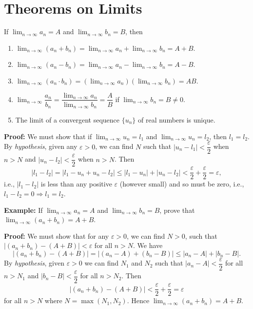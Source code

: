 \documentclass[titlepage,a4paper,12pt]{report}
\begin{document}
\section{Theorems on Limits}
If $\displaystyle \lim _{n\rightarrow \infty} a_n =A$ and $\displaystyle \lim _{n\rightarrow \infty} b_n =B$, then 
\begin{enumerate}
\item $\displaystyle \lim _{n\rightarrow \infty} (a_n +b_n) = \lim _{n\rightarrow \infty} a_n + \lim _{n\rightarrow \infty} b_n =A +B$.
\item $\displaystyle \lim _{n\rightarrow \infty} (a_n-b_n) = \lim _{n\rightarrow \infty} a_n-\displaystyle \lim _{n\rightarrow \infty} b_n =A-B$.
\item $\displaystyle \lim _{n\rightarrow \infty} (a_n\cdot b_n)=(\lim _{n\rightarrow \infty} a_n)(\lim _{n\rightarrow \infty} b_n)=AB$.
\item $\displaystyle \lim _{n\rightarrow \infty} \dfrac{a_n}{b_n}=\dfrac{\displaystyle \lim _{n\rightarrow \infty} a_n}{\displaystyle \lim _{n\rightarrow \infty} b_n} =\dfrac{A}{B}$ if $\displaystyle \lim _{n\rightarrow \infty} b_n =B\neq 0$.
\item The limit of a convergent sequence $\{u_n\}$ of real numbers is unique. 
\end{enumerate}
\noindent \textbf{Proof:} We must show that if $\displaystyle \lim _{n\rightarrow \infty} u_n=l_1$ and $\displaystyle \lim _{n\rightarrow \infty} u_n=l_2$, then $l_1=l_2$. By \textit{hypothesis}, given any $\varepsilon >0$, we can find $N$ such that $|u_n-l_1|<\dfrac{\varepsilon}{2}$ when $n>N$ and $|u_n-l_2|<\dfrac{\varepsilon}{2}$ when $n>N$. Then 
\begin{equation*}
|l_1-l_2|=|l_1-u_n+u_n-l_2| \leq |l_1-u_n|+|u_n-l_2|<\dfrac{\varepsilon}{2}+\dfrac{\varepsilon}{2}=\varepsilon , 
\end{equation*}
i.e., $|l_1-l_2|$ is less than any positive $\varepsilon$ (however small) and so must be zero, i.e., $l_1-l_2=0\Longrightarrow l_1=l_2$.

\noindent \textbf{Example:} If $\displaystyle \lim _{n\rightarrow \infty} a_n=A$ and $\displaystyle \lim _{n\rightarrow \infty} b_n=B$, prove that $\displaystyle \lim _{n\rightarrow \infty} (a_n +b_n )=A+B$.

\noindent \textbf{Proof:} We must show that for any $\varepsilon >0$, we can find $N>0$, such that $|(a_n+b_n)-(A+B)|<\varepsilon$ for all $n>N$. We have 
\begin{equation*}
|(a_n+b_n)-(A+B)|=|(a_n-A)+(b_n-B)| \leq |a_n-A| +|b_n-B|.
\end{equation*} 
By \textit{hypothesis}, given $\varepsilon >0$ we can find $N_1$ and $N_2$ such that $|a_n-A|<\dfrac{\varepsilon}{2}$ for all $n>N_1$ and $|b_n-B|<\dfrac{\varepsilon}{2}$ for all $n>N_2$. Then 
\begin{equation*}
|(a_n+b_n)-(A+B)|<\dfrac{\varepsilon}{2} +\dfrac{\varepsilon}{2}=\varepsilon
\end{equation*}
for all $n>N$ where $N=\max (N_1, N_2)$. Hence $\displaystyle \lim _{n\rightarrow \infty}(a_n+b_n)=A+B$.
\end{document}
